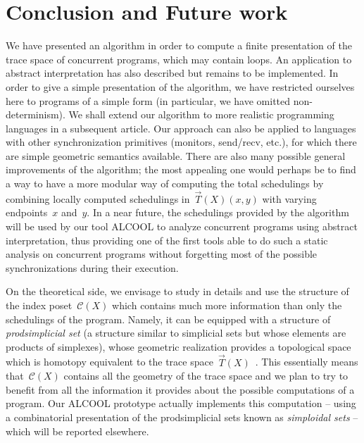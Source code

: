 \documentclass[orivec]{llncs} \usepackage[T1]{fontenc}
\newcommand{\C}{\mathcal{C}}
\newcommand{\tspace}[1]{\vec T(#1)}
\renewcommand{\C}{\mathcal{C}}
\begin{document}
\section{Conclusion and Future work}
\label{concl}
We have presented an algorithm in order to compute a finite presentation of the
trace space of concurrent programs, which may contain loops. An application to
abstract interpretation has also described but remains to be implemented. In
order to give a simple presentation of the algorithm, we have restricted
ourselves here to programs of a simple form (in particular, we have omitted
non-determinism). We shall extend our algorithm to more realistic programming
languages in a subsequent article. Our approach can also be applied to languages
with other synchronization primitives (monitors, send/recv, etc.), for which
there are simple geometric semantics available.  There are also many possible
general improvements of the algorithm; the most appealing one would perhaps be
to find a way to have a more modular way of computing the total schedulings by
combining locally computed schedulings in~$\tspace{X}(x,y)$ with varying
endpoints~$x$ and~$y$. In a near future, the schedulings provided by the
algorithm will be used by our tool ALCOOL to analyze concurrent programs using
abstract interpretation, thus providing one of the first tools able to do such a
static analysis on concurrent programs without forgetting most of the possible
synchronizations during their execution.

On the theoretical side, we envisage to study in details and use the structure
of the index poset~$\C(X)$ which contains much more information than only the
schedulings of the program. Namely, it can be equipped with a structure of
\emph{prodsimplicial set} \cite{kozlov} (a structure similar to simplicial sets
but whose elements are products of simplexes), whose geometric realization
provides a topological space which is homotopy equivalent to the trace
space~$\tspace{X}$~\cite{raussen2010simplicial}. This essentially means
that~$\C(X)$ contains all the geometry of the trace space and we plan to try to
benefit from all the information it provides about the possible computations of
a program. Our ALCOOL prototype actually implements this computation -- using a
combinatorial presentation of the prodsimplicial sets known as \emph{simploidal
  sets} \cite{simploidal} -- which will be reported elsewhere.


















\end{document}
